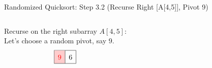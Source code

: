 \begin{frame}{Randomized Quicksort: Step 3.2 (Recurse Right [A[4,5]], Pivot 9)}
  \begin{columns}[t]
    Recurse on the right subarray $A[4,5]$:
    \\[0.5em]
    Let's choose a random pivot, say 9.
    \[
      \renewcommand{\arraystretch}{1.5}
      \begin{array}{|c|c|}
        \hline
        \cellcolor{red!20}\textcolor{red}{9} & 6 \\
        \hline
      \end{array}
    \]

    \begin{minipage}[t]{\linewidth}
      \vspace{0pt} %
      \begin{center}


\end{center}
\end{minipage}
\end{columns}
\end{frame}
